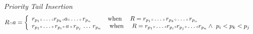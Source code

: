 

\hspace{-7mm} \emph{Priority Tail Insertion} \\
\begin{equation}
\label{pri_tl_ins}
  R \smodot a  = \left \{
    \begin{array}{l}
      r_{p_1}\smcirc\ldots\smcirc r_{p_k}\smcirc a\smcirc\ldots\smcirc\,r_{p_n} 
      \ \ \ \ \ \ \ \ \text{when}\ \ \ \ 
      R=r_{p_1}\smcirc\ldots\smcirc\,r_{p_k}\smcirc\ldots\smcirc\,r_{p_n}  \\ 
      r_{p_1}\smcirc\ldots\smcirc\,r_{p_i}\smcirc\,a\,\smcirc\,r_{p_j}\,\ldots\,r_{p_n}
      \ \ \ \ \text{when} \ \ \ \   
      R = r_{p_1}\smcirc\ldots\smcirc r_{p_i}\smcirc r_{p_j}\smcirc\ldots\smcirc r_{p_n} 
       \wedge \  p_i < p_k < p_j  
    \end{array} 
  \right.
\end{equation}

